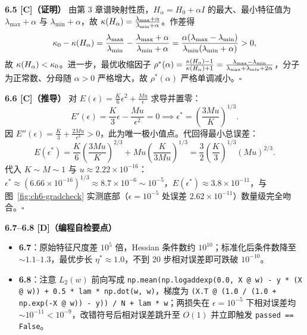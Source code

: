 \textbf{6.5 [C]（证明）}
由第 3 章谱映射性质，$H_\alpha = H_0 + \alpha I$ 的最大、最小特征值为 $\lambda_{\max}+\alpha$ 与 $\lambda_{\min}+\alpha$，故 $\kappa(H_\alpha) = \frac{\lambda_{\max}+\alpha}{\lambda_{\min}+\alpha}$。作差得
\[
  \kappa_0 - \kappa(H_\alpha) = \frac{\lambda_{\max}}{\lambda_{\min}} - \frac{\lambda_{\max}+\alpha}{\lambda_{\min}+\alpha}
  = \frac{\alpha(\lambda_{\max} - \lambda_{\min})}{\lambda_{\min}(\lambda_{\min}+\alpha)} > 0,
\]
故 $\kappa(H_\alpha) < \kappa_0$。进一步，最优收缩因子 $\rho^*(\alpha) = \frac{\kappa(H_\alpha)-1}{\kappa(H_\alpha)+1} = \frac{\lambda_{\max}-\lambda_{\min}}{\lambda_{\max}+\lambda_{\min}+2\alpha}$，分子为正常数、分母随 $\alpha>0$ 严格增大，故 $\rho^*(\alpha)$ 严格单调减小。$\square$

\textbf{6.6 [C]（推导）}
对 $E(\epsilon) = \frac{K}{6}\epsilon^2 + \frac{Mu}{\epsilon}$ 求导并置零：
\[
  E'(\epsilon) = \frac{K}{3}\epsilon - \frac{Mu}{\epsilon^2} = 0 \implies \epsilon^* = \left(\frac{3Mu}{K}\right)^{1/3}.
\]
因 $E''(\epsilon) = \frac{K}{3} + \frac{2Mu}{\epsilon^3} > 0$，此为唯一极小值点。代回得最小总误差：
\[
  E(\epsilon^*) = \frac{K}{6}\left(\frac{3Mu}{K}\right)^{2/3} + Mu\left(\frac{K}{3Mu}\right)^{1/3}
  = \frac{3}{2}\left(\frac{K}{3}\right)^{1/3}(Mu)^{2/3}.
\]
代入 $K\sim M\sim 1$ 与 $u\approx 2.22\times 10^{-16}$：$\epsilon^* \approx (6.66\times 10^{-16})^{1/3} \approx 8.7\times 10^{-6} \sim 10^{-5}$，$E(\epsilon^*) \approx 3.8\times 10^{-11}$，与图~\ref{fig:ch6-gradcheck} 实测底部（$\epsilon=10^{-5}$ 处误差 $2.62\times 10^{-11}$）数量级完全吻合。$\square$

\textbf{6.7--6.8 [D]（编程自检要点）}
\begin{itemize}
  \item \textbf{6.7}：原始特征尺度差 $10^5$ 倍，Hessian 条件数约 $10^{10}$；标准化后条件数降至 $\sim 1.1$--$1.3$，最优步长 $\eta^* \approx 1.0$，不到 $20$ 步相对误差即可跌破 $10^{-10}$。
  \item \textbf{6.8}：注意 $L_2(w)$ 前向写成 \texttt{np.mean(np.logaddexp(0.0, X @ w) - y * (X @ w)) + 0.5 * lam * np.dot(w, w)}，梯度为 \texttt{(X.T @ (1.0 / (1.0 + np.exp(-X @ w)) - y)) / N + lam * w}；两损失在 $\epsilon=10^{-5}$ 下相对误差均 $\sim 10^{-11} < 10^{-9}$，改错符号后相对误差跳升至 $O(1)$ 并立即触发 \texttt{passed == False}。
\end{itemize}
